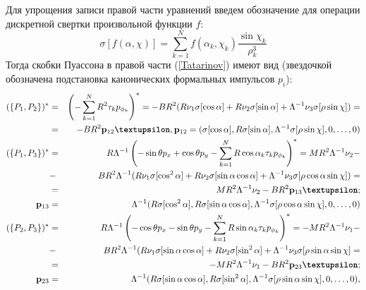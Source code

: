 Для упрощения записи правой части уравнений введем обозначение для операции дискретной свертки произвольной функции $f$:
$$
\sigma[f(\alpha,\chi)] = \sum\limits_{k=1}^{N} f(\alpha_k,\chi_k) \frac{\sin\chi_k}{\rho_k^3}
$$
Тогда скобки Пуассона в правой части (\ref{Tatarinov}) имеют вид (звездочкой обозначена подстановка канонических формальных импульсов $p_i$):
\begin{eqnarray*}
(\{P_1,P_2\})^* &=& \left(-\sum\limits_{k=1}^{N} R^2\tau_kp_{\phi_k}\right)^* =
-BR^2(R\nu_1 \sigma[\cos\alpha] + R\nu_2 \sigma[\sin\alpha] + \Lambda^{-1}\nu_3\sigma[\rho\sin\chi]) = \\
&=& -BR^2\prhs_{12}\vnu, \prhs_{12} =
(\sigma[\cos\alpha], R\sigma[\sin\alpha], \Lambda^{-1}\sigma[\rho\sin\chi], 0,\dots,0)
\\
(\{P_1,P_3\})^* &=& {R}{\Lambda}^{-1}\left(-\sin\theta p_x + \cos\theta p_y - \sum\limits_{k=1}^{N} R\cos\alpha_k\tau_kp_{\phi_k}\right)^* = {MR^2}{\Lambda}^{-1}\nu_2 -\\
&-& {BR^2}{\Lambda}^{-1}(R\nu_1 \sigma[\cos^2\alpha] + R\nu_2 \sigma[\sin\alpha\cos\alpha] + \Lambda^{-1}\nu_3\sigma[\rho\cos\alpha\sin\chi])=\\
&=& {MR^2}{\Lambda}^{-1}\nu_2-{BR^2} \prhs_{13}\vnu;\\
\prhs_{13} &=& \Lambda^{-1}
(R\sigma[\cos^2\alpha], R\sigma[\sin\alpha\cos\alpha], \Lambda^{-1}\sigma[\rho\cos\alpha\sin\chi], 0,\dots,0)
\\
(\{P_2,P_3\})^* &=& {R}{\Lambda}^{-1}\left(-\cos\theta p_x - \sin\theta p_y - \sum\limits_{k=1}^{N} R\sin\alpha_k\tau_kp_{\phi_k}\right)^*  = -{MR^2}{\Lambda}^{-1}\nu_1 -\\
&-& {BR^2}{\Lambda}^{-1}(R\nu_1\sigma[\sin\alpha\cos\alpha] + R\nu_2\sigma[\sin^2\alpha]+\Lambda^{-1}\nu_3\sigma[\rho\sin\alpha\sin\chi] =
\\
&=&-{MR^2}{\Lambda}^{-1}\nu_1 -{BR^2}\prhs_{23}\vnu;\\
\prhs_{23} &=& \Lambda^{-1}
(R\sigma[\sin\alpha\cos\alpha], R\sigma[\sin^2\alpha], \Lambda^{-1}\sigma[\rho\sin\alpha\sin\chi], 0,\dots,0),
\end{eqnarray*}
